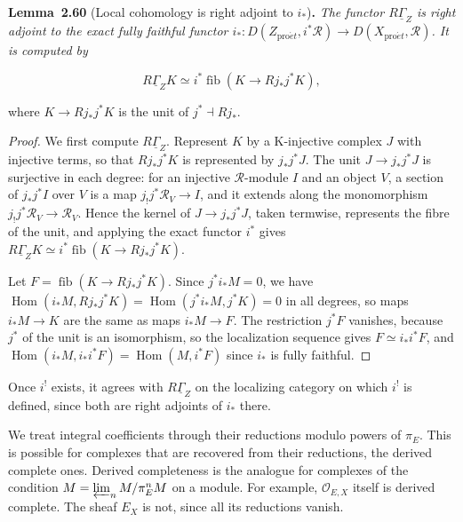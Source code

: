 \documentclass[11pt]{article}
\newenvironment{bpstatement}[2]{\par\addvspace{0.6\baselineskip}\noindent\textbf{#1}#2\textbf{.}\enspace\ignorespaces}
  {\par\addvspace{0.4\baselineskip}}
\newenvironment{bpstatementit}[2]{\begin{bpstatement}{#1}{#2}\itshape\ignorespaces}{\end{bpstatement}}
\providecommand{\fib}{}\renewcommand{\fib}{\operatorname{fib}}
\begin{document}
\label{bp185}%
\begin{bpstatementit}{Lemma~2.60}{ (Local cohomology is right adjoint to $i_*$)}
The functor \(R\underline\Gamma_Z\) is right adjoint to the exact fully faithful functor \(i_*:D(Z_{\mathrm{pro}\acute{e}t},i^*\mathcal R)\to D(X_{\mathrm{pro}\acute{e}t},\mathcal R)\). It is computed by

\[
R\underline\Gamma_ZK\simeq i^*\fib(K\longrightarrow Rj_*j^*K),
\]

where \(K\to Rj_*j^*K\) is the unit of \(j^*\dashv Rj_*\).
\end{bpstatementit}

\begin{proof}[{Proof}]\label{bp186}%
We first compute \(R\underline\Gamma_Z\). Represent \(K\) by a K-injective complex \(J\) with injective terms, so that \(Rj_*j^*K\) is represented by \(j_*j^*J\). The unit \(J\to j_*j^*J\) is surjective in each degree: for an injective \(\mathcal R\)-module \(I\) and an object \(V\), a section of \(j_*j^*I\) over \(V\) is a map \(j_!j^*\mathcal R_V\to I\), and it extends along the monomorphism \(j_!j^*\mathcal R_V\to\mathcal R_V\). Hence the kernel of \(J\to j_*j^*J\), taken termwise, represents the fibre of the unit, and applying the exact functor \(i^*\) gives \(R\underline\Gamma_ZK\simeq i^*\fib(K\to Rj_*j^*K)\).

Let \(F=\fib(K\to Rj_*j^*K)\). Since \(j^*i_*M=0\), we have \(\operatorname{Hom}(i_*M,Rj_*j^*K)=\operatorname{Hom}(j^*i_*M,j^*K)=0\) in all degrees, so maps \(i_*M\to K\) are the same as maps \(i_*M\to F\). The restriction \(j^*F\) vanishes, because \(j^*\) of the unit is an isomorphism, so the localization sequence gives \(F\simeq i_*i^*F\), and \(\operatorname{Hom}(i_*M,i_*i^*F)=\operatorname{Hom}(M,i^*F)\) since \(i_*\) is fully faithful.
\end{proof}

\label{bp187}%
Once \(i^!\) exists, it agrees with \(R\underline\Gamma_Z\) on the localizing category on which \(i^!\) is defined, since both are right adjoints of \(i_*\) there.

We treat integral coefficients through their reductions modulo powers of \(\pi_E\). This is possible for complexes that are recovered from their reductions, the derived complete ones. Derived completeness is the analogue for complexes of the condition \(M=\varprojlim_nM/\pi_E^nM\) on a module. For example, \(\mathcal O_{E,X}\) itself is derived complete. The sheaf \(E_X\) is not, since all its reductions vanish.
\end{document}
